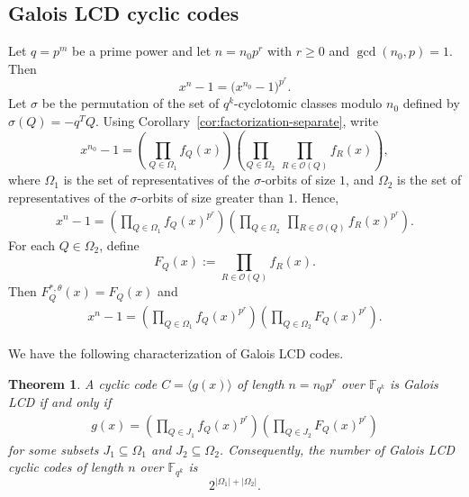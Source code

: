 \documentclass[pdflatex,sn-mathphys-num]{sn-jnl}%
\theoremstyle{thmstyleone}%
\newtheorem{theorem}{Theorem}%
\theoremstyle{thmstyletwo}%
\theoremstyle{thmstylethree}%
\newcommand{\F}{\mathbb{F}}
\begin{document}
\subsection{Galois LCD cyclic codes}

  Let
$
q=p^m$
be a prime power  and let $
n=n_0p^r$
with $r\ge 0$ and $\gcd(n_0,p)=1$. Then
\[
x^n-1=\bigl(x^{n_0}-1\bigr)^{p^r}.
\]
Let $\sigma$ be the permutation of the set of $q^k$-cyclotomic classes modulo $n_0$ defined by
$
\sigma(Q)=-q^TQ$.
Using Corollary~\ref{cor:factorization-separate}, write
\[
x^{n_0}-1=
\left(\prod_{Q\in \Omega_1} f_Q(x)\right)
\left(\prod_{Q\in \Omega_2}\ \prod_{R\in \mathcal O(Q)} f_R(x)\right),
\]
where $\Omega_1$ is the set of representatives of the $\sigma$-orbits of size $1$, and $\Omega_2$ is the set of representatives of the $\sigma$-orbits of size greater than $1$. Hence,
\begin{align} \label{xn-1-expan}
x^n-1=
\left(\prod_{Q\in \Omega_1} f_Q(x)^{p^r}\right)
\left(\prod_{Q\in \Omega_2}\ \prod_{R\in \mathcal O(Q)} f_R(x)^{p^r}\right).
\end{align}
For each $Q\in \Omega_2$, define
\[
F_Q(x):=\prod_{R\in\mathcal O(Q)} f_R(x).
\]
Then
$
F_Q^{\ast,\theta}(x)=F_Q(x)
$
and 
\begin{align}\label{eq-xn-1}
x^n-1=
\left(\prod_{Q\in \Omega_1} f_Q(x)^{p^r}\right)
\left(\prod_{Q\in \Omega_2} F_Q(x)^{p^r}\right).
\end{align}

We have the following characterization of 
Galois LCD codes.
\begin{theorem}\label{thm:lcd-rr}
A cyclic code $C=\langle g(x)\rangle$ of length $n=n_0p^r$ over $\F_{q^k}$ is Galois LCD if and only if
\begin{align}\label{gen-LCD}
g(x)=
\left(\prod_{Q\in J_1} f_Q(x)^{p^r}\right)
\left(\prod_{Q\in J_2} F_Q(x)^{p^r}\right)
\end{align}
for some subsets $J_1\subseteq \Omega_1$ and $J_2\subseteq \Omega_2$. Consequently, the number of Galois LCD cyclic codes of length $n$ over $\F_{q^k}$ is
\[
2^{|\Omega_1|+|\Omega_2|}.
\]
\end{theorem}
\end{document}
